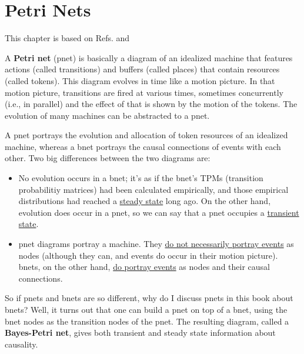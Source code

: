 \chapter{Petri Nets}
\label{petri}


\newcommand{\pospart}[1]{\left(#1\right)^{\geq 0}}

\newcommand{\posvec}[1]{
\left(#1\right)^{\text{+vec}}
}

\newcommand{\petriar}[3]{{\ar@{.>}@/_1pc/[#1]|*++[o][F-]{#2}
\ar[#1]
\ar@{<.}@/^1pc/[#1]|*++[o][F-]{#3}
}}

\newcommand{\petriarDR}[3]{\ar@[red]@{->}@/_1pc/[#1]|*++[o][F-]{#2}
\ar[#1]
\ar@{<.}@/^1pc/[#1]|*++[o][F-]{#3}
}

\newcommand{\petriarUR}[3]{\ar@{.>}@/_1pc/[#1]|*++[o][F-]{#2}
\ar[#1]
\ar@[red]@{<-}@/^1pc/[#1]|*++[o][F-]{#3}
}
This chapter
is based on Refs.\cite{wiki-pnet} and \cite{tucci-bayes-petri}

A {\bf Petri net} (pnet)
is basically a diagram of an 
idealized machine that 
features actions (called transitions)
and
buffers (called places)
that contain resources (called tokens).
This diagram evolves in time like a motion picture.  In that motion picture, transitions are fired at various times, sometimes concurrently (i.e., in parallel) and the effect of that is shown  by the motion of the tokens. The evolution of many
 machines can be abstracted
to a pnet.

A pnet  portrays the evolution and allocation of token resources of
an idealized machine, whereas 
a bnet 
portrays the causal connections of events with each other. 
Two big differences between the two diagrams  are:

\begin{itemize}
\item No evolution occurs in a bnet; it's as if the
bnet's TPMs (transition probabilitiy matrices) had been calculated empirically, and those empirical distributions
had reached a \ul{steady state} long ago.
On the other hand, evolution does occur in a pnet, so
we can say that a pnet  occupies a \ul{ transient state}.
\item pnet diagrams portray a machine. They \ul{do not necessarily portray events} as nodes (although they can, and events do occur in their motion picture). bnets, on the
other hand,  \ul{do portray  events} as nodes and
their causal connections.

\end{itemize}

So if pnets and bnets are so different,
why do I discuss pnets in this book
about bnets? Well,
it turns out that one can build a pnet
on top of a bnet, using the bnet nodes
as the transition nodes of the pnet. The 
resulting diagram,
called  a {\bf Bayes-Petri net},
gives both transient and steady state 
information about causality.

